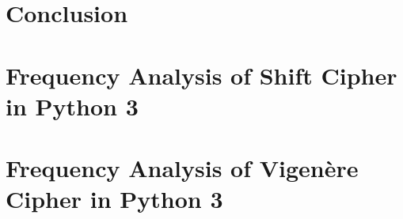 \documentclass[12pt]{article}
\begin{document}
\section{Conclusion}


\newpage


\newpage
\appendix

\section{Frequency Analysis of Shift Cipher in Python 3}



\newpage
\section{Frequency Analysis of Vigen\`{e}re Cipher in Python 3}


\end{document}
